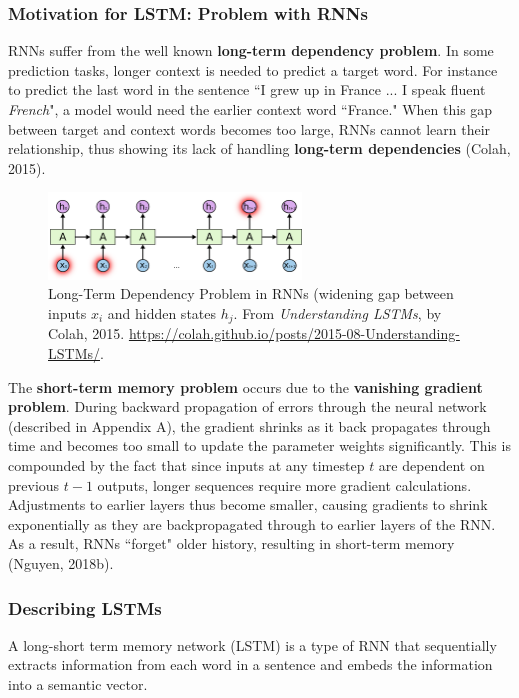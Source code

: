 \subsubsection{Motivation for LSTM: Problem with RNNs}

RNNs suffer from the well known \textbf{long-term dependency problem}. In some prediction tasks, longer context is needed to predict a target word. For instance to predict the last word in the sentence ``I grew up in France ... I speak fluent \emph{French}", a model would need the earlier context word ``France." When this gap between target and context words becomes too large, RNNs cannot learn their relationship, thus showing its lack of handling \textbf{long-term dependencies} (Colah, 2015). 

\begin{figure}[h]
\vspace{-5pt}
\centering
\includegraphics[width=0.6\textwidth]{imgs/rnn_longterm.png}
\vspace{-5pt}
\caption{\footnotesize Long-Term Dependency Problem in RNNs (widening gap between inputs $x_i$ and hidden states $h_j$. From \emph{Understanding LSTMs}, by Colah, 2015. \url{https://colah.github.io/posts/2015-08-Understanding-LSTMs/}. }
\vspace{-5pt}
\end{figure}

The \textbf{short-term memory problem} occurs due to the \textbf{vanishing gradient problem}. During backward propagation of errors through the neural network (described in Appendix A), the gradient shrinks as it back propagates through time and becomes too small to update the parameter weights significantly. This is compounded by the fact that since inputs at any timestep $t$ are dependent on previous $t-1$ outputs, longer sequences require more gradient calculations. Adjustments to earlier layers thus become smaller, causing gradients to shrink exponentially as they are backpropagated through to earlier layers of the RNN. As a result, RNNs ``forget" older history, resulting in short-term memory (Nguyen, 2018b). 


\subsubsection{Describing LSTMs}
A long-short term memory network (LSTM) is a type of RNN that sequentially extracts information from each word in a sentence and embeds the information into a semantic vector. 

